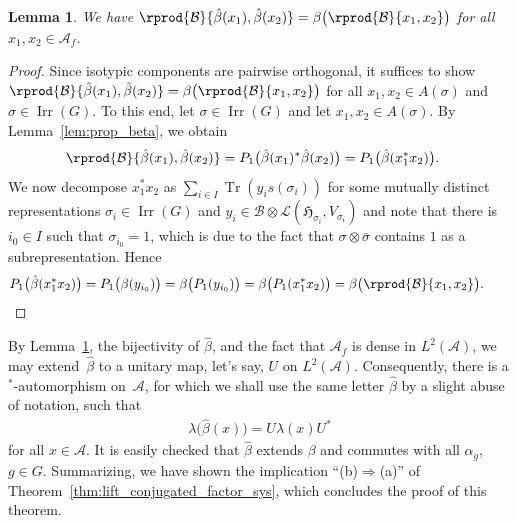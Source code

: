 \documentclass[pdftex]{sigma}
\numberwithin{equation}{section}
\newtheorem{Lemma}[Theorem]{Lemma}
\newcommand*{\tensor}{\otimes}		%
\DeclareMathOperator{\Tr}{Tr}		%
\newcommand*{\Star}{$^*$\nobreakdash}
\newcommand*{\hilb}{\mathfrak}		%
\newcommand*{\alg}{\mathcal}		%
\newcommand*{\hH}{\hilb{H}}			%
\newcommand*{\aA}{\alg{A}}			%
\newcommand*{\aB}{\alg{B}} 			%
\newcommand*{\End}{\mathcal{L}} %
\DeclareMathOperator{\Irrep}{Irr} 			%
\begin{document}
\begin{Lemma}\label{lem:beta_iso}
	We have $\rprod{\aB}{\hat\beta(x_1), \hat\beta(x_2)} = \beta\bigl( \rprod{\aB}{x_1, x_2} \bigr)$ for all $x_1, x_2 \in \aA_f$.
\end{Lemma}
\begin{proof}
	Since isotypic components are pairwise orthogonal, it suffices to show $\rprod{\aB}{\hat\beta(x_1), \hat\beta(x_2)} \allowbreak = \beta\bigl( \rprod{\aB}{x_1, x_2} \bigr)$ for all $x_1, x_2 \in A(\sigma)$ and $\sigma \in \Irrep(G)$.
	To this end, let $\sigma \in \Irrep(G)$ and let $x_1, x_2 \in A(\sigma)$.
	By Lemma~\ref{lem:prop_beta}, we obtain
	\begin{align*}
		\rprod{\aB}{\hat\beta(x_1), \hat\beta(x_2)}
		&=
		P_1\big( \hat\beta(x_1)^*\hat\beta(x_2) \big)
		=
		P_1\big( \hat\beta(x_1^*x_2) \big).
	\end{align*}
	We now decompose $x_1^*x_2$ as $\sum_{i \in I} \Tr( y_i s(\sigma_i) )$ for some mutually distinct representations $\sigma_i \in \Irrep(G)$ and $y_i \in \aB \tensor \End(\hH_{\sigma_i},V_{\sigma_i})$ and note that there is $i_0 \in I$ such that $\sigma_{i_0} = 1$, which is due to the fact that $\sigma \tensor \bar \sigma$ contains $1$ as a subrepresentation.
	Hence
	\begin{gather*}
		P_1\big( \hat\beta(x_1^*x_2) \big)
		=
		P_1\big( \beta(y_{i_0}) \big)
		=
		\beta\big( P_1(y_{i_0}) \big)
		=
		\beta\big( P_1(x_1^*x_2) \big)
		=
		\beta\bigl( \rprod{\aB}{x_1, x_2} \bigr).
		\tag*{\qed}
	\end{gather*}
	\renewcommand{\qed}{}
\end{proof}

By Lemma~\ref{lem:beta_iso}, the bijectivity of $\hat \beta$, and the fact that $\aA_f$ is dense in $L^2(\aA)$, we may extend~$\hat \beta$ to a unitary map, let's say, $U$ on $L^2(\aA)$.
Consequently, there is a \Star-automorphism on~$\aA$, for which we shall use the same letter $\hat \beta$ by a slight abuse of notation, such that
\begin{align*}
	\lambda\big( \hat \beta(x) \big) = U \lambda(x) U^*
\end{align*}
for all $x \in \aA$.
It is easily checked that $\hat \beta$ extends $\beta$ and commutes with all $\alpha_g$, $g\in G$.
Summarizing, we have shown the implication ``(b)$\Rightarrow$(a)'' of Theorem~\ref{thm:lift_conjugated_factor_sys}, which concludes the proof of this theorem.
\end{document}
